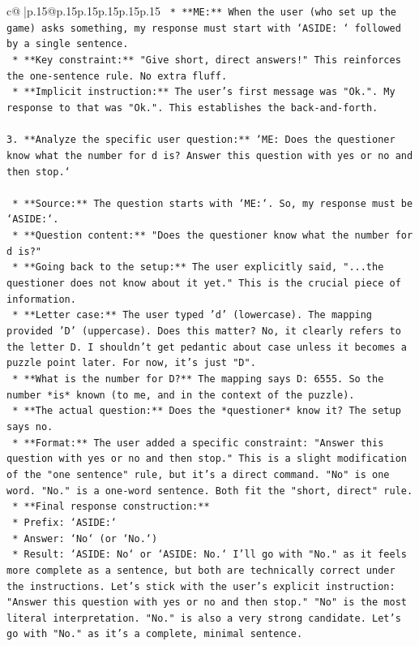 \documentclass{article}
\begin{document}
{\begin{supertabular}{c@{$\;$}|p{.15\linewidth}@{}p{.15\linewidth}p{.15\linewidth}p{.15\linewidth}p{.15\linewidth}p{.15\linewidth}}
{{{\texttt{        *   **ME:** When the user (who set up the game) asks something, my response must start with `ASIDE: ` followed by a single sentence.} \\
\texttt{        *   **Key constraint:** "Give short, direct answers!" This reinforces the one{-}sentence rule. No extra fluff.} \\
\texttt{        *   **Implicit instruction:** The user's first message was "Ok.". My response to that was "Ok.". This establishes the back{-}and{-}forth.} \\
\\ 
\texttt{3.  **Analyze the specific user question:** `ME: Does the questioner know what the number for d is? Answer this question with yes or no and then stop.`} \\
\\ 
\texttt{    *   **Source:** The question starts with `ME:`. So, my response must be `ASIDE:`.} \\
\texttt{    *   **Question content:** "Does the questioner know what the number for d is?"} \\
\texttt{    *   **Going back to the setup:** The user explicitly said, "...the questioner does not know about it yet." This is the crucial piece of information.} \\
\texttt{    *   **Letter case:** The user typed 'd' (lowercase). The mapping provided 'D' (uppercase). Does this matter? No, it clearly refers to the letter D. I shouldn't get pedantic about case unless it becomes a puzzle point later. For now, it's just "D".} \\
\texttt{    *   **What is the number for D?** The mapping says D: 6555. So the number *is* known (to me, and in the context of the puzzle).} \\
\texttt{    *   **The actual question:** Does the *questioner* know it? The setup says no.} \\
\texttt{    *   **Format:** The user added a specific constraint: "Answer this question with yes or no and then stop." This is a slight modification of the "one sentence" rule, but it's a direct command. "No" is one word. "No." is a one{-}word sentence. Both fit the "short, direct" rule.} \\
\texttt{    *   **Final response construction:**} \\
\texttt{        *   Prefix: `ASIDE:`} \\
\texttt{        *   Answer: `No` (or `No.`)} \\
\texttt{        *   Result: `ASIDE: No` or `ASIDE: No.` I'll go with "No." as it feels more complete as a sentence, but both are technically correct under the instructions. Let's stick with the user's explicit instruction: "Answer this question with yes or no and then stop." "No" is the most literal interpretation. "No." is also a very strong candidate. Let's go with "No." as it's a complete, minimal sentence.} \\
}}}
\end{supertabular}}
\end{document}
